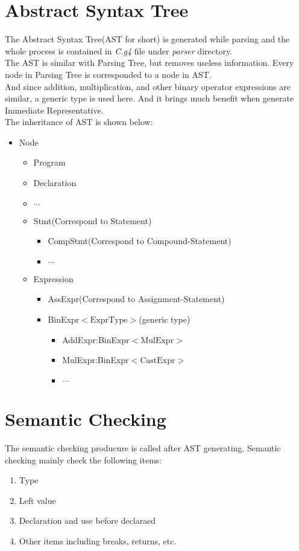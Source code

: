 \documentclass[nocopyrightspace]{sigplanconf}
\begin{document}
\section{Abstract Syntax Tree}
The Abstract Syntax Tree(AST for short) is generated while parsing and the whole process is contained in \textit{C.g4} file under \textit{parser} directory. \\
The AST is similar with Parsing Tree, but removes useless information. Every node in Parsing Tree is corresponded to a node in AST.\\
And since addition, multiplication, and other binary operator expressions are similar, a generic type is used here. And it brings much benefit when generate Immediate Representative.\\
The inheritance of AST is shown below:\\
\begin{itemize}
\item Node
\begin{itemize}
	\item Program
	\item Declaration
	\item $\cdots$
	\item Stmt(Correspond to Statement)
	\begin{itemize}
		\item CompStmt(Correspond to Compound-Statement)
		\item $\cdots$
	\end{itemize}
	\item Expression
	\begin{itemize}
		\item AssExpr(Correspond to Assignment-Statement)
		\item BinExpr$<\text{ExprType}>$(generic type)
		\begin{itemize}
			\item AddExpr:BinExpr$<\text{MulExpr}>$
			\item MulExpr:BinExpr$<\text{CastExpr}>$
			\item $\cdots$
		\end{itemize}
	\end{itemize}
\end{itemize}
\end{itemize}


\section{Semantic Checking}
The semantic checking producure is called after AST generating. Semantic checking mainly check the following items:
\begin{enumerate}
\item Type
\item Left value
\item Declaration and use before declaraed
\item Other items including breaks, returns, etc.
\end{enumerate}
\end{document}
